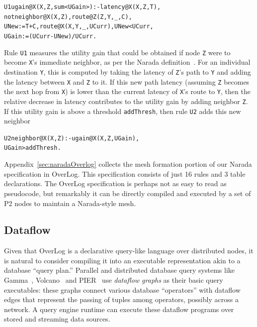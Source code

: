 \documentclass{sig-alt-full}
\def\Sys{P2\xspace}
\def\Lang{OverLog\xspace}
\def\PNaradaLines{16\xspace}
\newcommand{\ol}[1]{{\tt\footnotesize#1}}
\newenvironment{overlog}{\begin{alltt}\small}{\end{alltt}}
\begin{document}
\begin{overlog}
U1 ugain@X(X, Z, sum<UGain>) :- latency@X(X, Z, T),
  not neighbor@X(X, Z), route@Z(Z, Y, _, C), 
  UNew := T + C, route@X(X, Y, _, UCurr), UNew < UCurr,
  UGain := (UCurr - UNew) / UCurr.
\end{overlog}
Rule \ol{U1} measures the utility gain that could be obtained if node
\ol{Z} were to become \ol{X}'s immediate neighbor, as per the Narada
definition~\cite{chu00case}. For an individual destination \ol{Y}, this
is computed by taking the latency of \ol{Z}'s path to \ol{Y} and adding
the latency between \ol{X} and \ol{Z} to it. If this new path latency
(assuming \ol{Z} becomes the next hop from \ol{X}) is lower than the
current latency of \ol{X}'s route to \ol{Y}, then the relative decrease
in latency contributes to the utility gain by adding neighbor \ol{Z}.
If this utility gain is above a threshold \ol{addThresh}, then rule
\ol{U2} adds this new neighbor
\begin{overlog}
U2 neighbor@X(X, Z) :- ugain@X(X, Z, UGain),
  UGain > addThresh.
\end{overlog}

Appendix~\ref{sec:naradaOverlog} collects the mesh formation portion of
our Narada specification in \Lang. This specification consists of just \PNaradaLines
rules and 3 table declarations.  The \Lang specification is perhaps
not as easy to 
read as pseudocode, but remarkably it can be directly compiled and
executed by a set of \Sys nodes to maintain a Narada-style mesh.   

\subsection{Dataflow}
Given that \Lang is a declarative query-like language over distributed
nodes, it is natural to consider compiling it into an executable
representation akin to a database ``query plan.''  Parallel
and distributed database query systems like Gamma~\cite{gamma}, 
Volcano~\cite{graefe-sigmod90} and PIER~\cite{pier-cidr} use {\em
dataflow graphs} 
as their basic query executables: these graphs connect various
database ``operators'' with dataflow edges that represent the passing
of tuples among operators, possibly across a network.  A query engine
runtime can execute these dataflow programs over stored and streaming
data sources.
\end{document}
